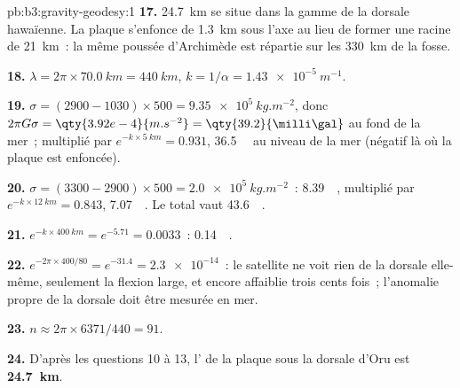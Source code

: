 \begin{solution}{pb:b3:gravity-geodesy:1}
\textbf{17.} \qty{24.7}{km} se situe dans la gamme de la dorsale hawaïenne. La
plaque s'enfonce de \qty{1.3}{km} sous l'axe au lieu de former une racine de
\qty{21}{km}~: la même poussée d'Archimède est répartie sur les \qty{330}{km} de la fosse.

\textbf{18.} $\lambda = 2\pi\times\qty{70.0}{km} = \qty{440}{km}$,
$k = 1/\alpha = \qty{1.43e-5}{m^{-1}}$.

\textbf{19.} $\sigma = (2900 - 1030)\times500 = \qty{9.35e5}{kg.m^{-2}}$, donc
$2\pi G\sigma = \qty{3.92e-4}{m.s^{-2}} = \qty{39.2}{\milli\gal}$ au fond de la mer~;
multiplié par $e^{-k\times\qty{5}{km}} = 0.931$, \qty{36.5}{\milli\gal} au niveau de la mer
(négatif là où la plaque est enfoncée).

\textbf{20.} $\sigma = (3300 - 2900)\times500 = \qty{2.0e5}{kg.m^{-2}}$~:
\qty{8.39}{\milli\gal}, multiplié par $e^{-k\times\qty{12}{km}} = 0.843$,
\qty{7.07}{\milli\gal}. Le total vaut \qty{43.6}{\milli\gal}.

\textbf{21.} $e^{-k\times\qty{400}{km}} = e^{-5.71} = 0.0033$~: \qty{0.14}{\milli\gal}.

\textbf{22.} $e^{-2\pi\times400/80} = e^{-31.4} = \num{2.3e-14}$~: le satellite
ne voit rien de la dorsale elle-même, seulement la flexion large, et encore
affaiblie trois cents fois~; l'anomalie propre de la dorsale doit être mesurée en mer.

\textbf{23.} $n \approx 2\pi\times6371/440 = 91$.

\textbf{24.} D'après les questions 10 à 13, l' de la
plaque sous la dorsale d'Oru est
\textbf{\qty[text-series-to-math=true]{24.7}{km}}.
\end{solution}
